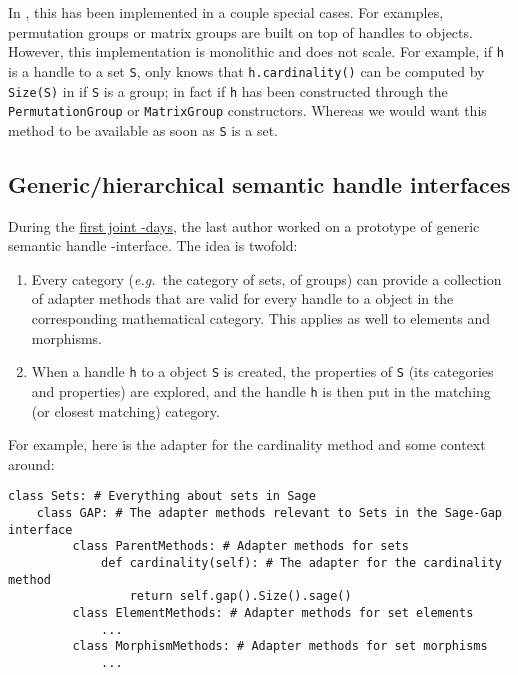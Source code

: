 In \Sage, this has been implemented in a couple special cases. For
examples, \Sage permutation groups or matrix groups are built on top
of handles to \GAP objects. However, this implementation is monolithic
and does not scale. For example, if \texttt{h} is a handle to a set
\texttt{S}, \Sage only knows that \texttt{h.cardinality()} can be
computed by \texttt{Size(S)} in \GAP if \texttt{S} is a group; in fact
if \texttt{h} has been constructed through the
\texttt{PermutationGroup} or \texttt{MatrixGroup}
constructors. Whereas we would want this method to be available as
soon as \texttt{S} is a set.

\subsection{Generic/hierarchical semantic handle interfaces}\label{generichierarchical-semantic-handle-interfaces}

During the \href{http://gapdays.de/gap-sage-days2016/}{first joint
  \GAP-\Sage days}, the last author worked on a prototype of generic
semantic handle \Sage-\GAP interface. The idea is twofold:

\begin{enumerate}
\def\labelenumi{\arabic{enumi}.}
\item Every \Sage category (\emph{e.g.}\ the category of sets, of groups) can
  provide a collection of adapter methods that are valid for every
  handle to a \GAP object in the corresponding mathematical category.
  This applies as well to elements and morphisms.
\item When a handle \texttt{h} to a \GAP object \texttt{S} is created,
  the properties of \texttt{S} (its \GAP categories and properties)
  are explored, and the handle \texttt{h} is then put in the matching
  (or closest matching) \Sage category.
\end{enumerate}

For example, here is the adapter for the cardinality method and some
context around:
\begin{lstlisting}
class Sets: # Everything about sets in Sage
    class GAP: # The adapter methods relevant to Sets in the Sage-Gap interface
         class ParentMethods: # Adapter methods for sets
             def cardinality(self): # The adapter for the cardinality method
                 return self.gap().Size().sage()
         class ElementMethods: # Adapter methods for set elements
             ...
         class MorphismMethods: # Adapter methods for set morphisms
             ...
\end{lstlisting}

